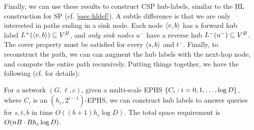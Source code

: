 Finally, we can use these results to construct CSP hub-labels, similar to the HL construction for SP (cf. \cref{ssec:hldef}).
A subtle difference is that we are only interested in paths ending in a sink node.
Each node $\pp{v,b}$ has a forward hub label $\Lf(\pp{v,b})\subseteq V^B$, and \emph{only sink nodes} $u^-$ have a reverse hub $\Lb(u^-)\subseteq V^B$.
The cover property must be satisfied for every $\pp{s,b}$ and $t^-$.
Finally, to reconstruct the path, we can can augment the hub labels with the next-hop node, and compute the entire path recursively.
Putting things together, we have the following (cf. \cite{TechReport} for details):

\begin{theorem}
	\label{theo:HLeff}
	For a network $(G,\ell,c)$, given a multi-scale EPHS $\crl*{C_i:i=0,1,\ldots,\log D}$, where $C_i$ is an $(h_c,2^{i-1})$-EPHS, we can construct hub labels 
	to answer queries for $s,t,b$ in time $O((b+1) h_c\log D)$.
	The total space requirement is $\Or(nB \cdot Bh_c\log D)$.
\end{theorem}

%
%

